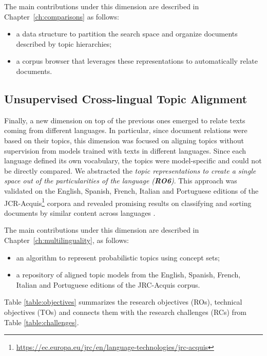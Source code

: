 The main contributions under this dimension are described in Chapter~\ref{ch:comparisons} as follows:
\begin{itemize}
\item a data structure to partition the search space and organize documents described by topic hierarchies;
\item a corpus browser that leverages these representations to automatically relate documents.
\end{itemize} 


\subsection{Unsupervised Cross-lingual Topic Alignment}

Finally, a new dimension on top of the previous ones emerged to relate texts coming from different languages. In particular, since document relations were based on their topics, this dimension was focused on aligning topics without supervision from models trained with texts in different languages. Since each language defined its own vocabulary, the topics were model-specific and could not be directly compared. We abstracted the \textit{topic representations to create a single space out of the particularities of the language (\textbf{RO6})}. This approach was validated on the English, Spanish, French, Italian and Portuguese editions of the JCR-Acquis\footnote{\url{https://ec.europa.eu/jrc/en/language-technologies/jrc-acquis}} corpora and revealed promising results on classifying and sorting documents by similar content across languages \citep{Badenes-Olmedo2019, Badenes-Olmedo2019b}. 

The main contributions under this dimension are described in Chapter~\ref{ch:multilinguality}, as follows: 
\begin{itemize}
\item an algorithm to represent probabilistic topics using concept sets;
\item a repository of aligned topic models from the English, Spanish, French, Italian and Portuguese editions of the JRC-Acquis corpus.
\end{itemize}

Table \ref{table:objectives} summarizes the research objectives (ROs), technical objectives (TOs) and connects them with the research challenges (RCs) from Table \ref{table:challenges}.


